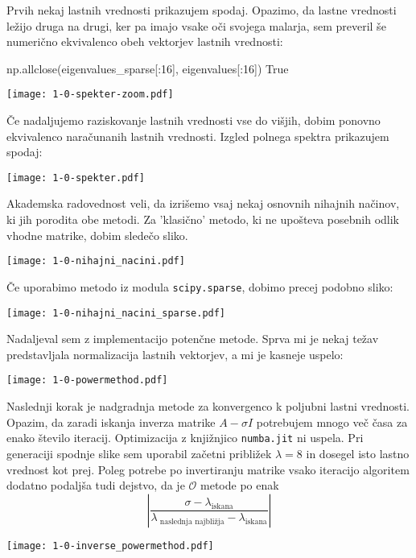 \documentclass[a4paper,oneside,12pt]{article}
\begin{document}
Prvih nekaj lastnih vrednosti prikazujem spodaj. Opazimo, da lastne vrednosti ležijo druga na drugi, ker pa imajo vsake oči svojega malarja, sem preveril še numerično ekvivalenco obeh vektorjev lastnih vrednosti:
\begin{python}
np.allclose(eigenvalues_sparse[:16], eigenvalues[:16])
True
\end{python}
\begin{center}
    \texttt{[image: 1-0-spekter-zoom.pdf]}
\end{center}
Če nadaljujemo raziskovanje lastnih vrednosti vse do višjih, dobim ponovno ekvivalenco naračunanih lastnih vrednosti. Izgled polnega spektra prikazujem spodaj:
\begin{center}
    \texttt{[image: 1-0-spekter.pdf]}
\end{center}
Akademska radovednost veli, da izrišemo vsaj nekaj osnovnih nihajnih načinov,  ki jih porodita obe metodi. Za 'klasično' metodo, ki ne upošteva posebnih odlik vhodne matrike, dobim sledečo sliko.
\begin{center}
    \texttt{[image: 1-0-nihajni\_nacini.pdf]}
\end{center}
Če uporabimo metodo iz modula \texttt{scipy.sparse}, dobimo precej podobno sliko:
\begin{center}
    \texttt{[image: 1-0-nihajni\_nacini\_sparse.pdf]}
\end{center}
Nadaljeval sem z implementacijo potenčne metode. Sprva mi je nekaj težav predstavljala normalizacija lastnih vektorjev, a mi je kasneje uspelo:

\begin{center}
    \texttt{[image: 1-0-powermethod.pdf]}
\end{center}

Naslednji korak je nadgradnja metode za konvergenco k poljubni lastni vrednosti. Opazim, da zaradi iskanja inverza matrike $A - \sigma I$ potrebujem mnogo več časa za enako število iteracij. Optimizacija z knjižnjico \texttt{numba.jit} ni uspela.  Pri generaciji spodnje slike sem uporabil začetni približek $\lambda = 8$ in dosegel isto lastno vrednost kot prej. Poleg potrebe po invertiranju matrike vsako iteracijo algoritem dodatno podaljša tudi dejstvo, da je $\mathcal{O}$ metode po \cite{wiki} enak
\[\left| \frac{\sigma - \lambda_{\text{iskana}}}{\lambda_{\text{ naslednja najbližja}} - \lambda_{\text{iskana}}} \right|\]

\begin{center}
    \texttt{[image: 1-0-inverse\_powermethod.pdf]}
\end{center}
\end{document}
